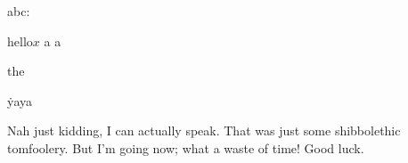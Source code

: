 abc^^z %

hello$x$ %
a%
a   %
\hi

the


\. yaya %
\  %

Nah just kidding, I can actually speak. That was just some shibbolethic tomfoolery. But I'm going now; what a waste of time! Good luck.
